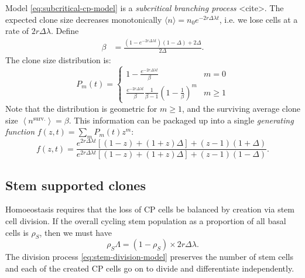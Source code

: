 \documentclass[10pt,UKenglish]{article}
\begin{document}
Model \ref{eq:subcritical-cp-model} is a \emph{subcritical branching process} <cite>. The expected clone size decreases monotonically $\langle n \rangle = n_0 e^{-2 r \Delta \lambda t}$, i.e. we lose cells at a rate of $2 r \Delta \lambda$. Define
\begin{align*}
\beta &= \frac{\left(1-e^{-2 r \Delta \lambda t}\right)(1-\Delta)+2\Delta}{2\Delta}.
\end{align*}
The clone size distribution is:
\begin{equation*}
P_m(t) = \begin{cases}
1 - \frac{e^{-2 r \Delta \lambda t}}{\beta} & m=0 \\
\frac{e^{-2 r \Delta \lambda t}}{\beta} \frac{1}{\beta-1} \left(1-\frac{1}{\beta}\right)^m & m\ge1
\end{cases}
\end{equation*}
Note that the distribution is geometric for $m \ge 1$, and the surviving average clone size $\left\langle n^\textrm{surv.} \right\rangle = \beta$. This information can be packaged up into a single \emph{generating function} $f(z,t) = \sum_m P_m(t) z^m$:
\begin{equation*}
f(z,t) = \frac{e^{2 r \Delta \lambda t}\left[(1-z) + (1+z)\Delta\right] + (z-1)(1+\Delta)}{e^{2 r \Delta \lambda t}\left[(1-z) + (1+z)\Delta\right] + (z-1)(1-\Delta)}.
\end{equation*}

\subsection{\label{sec:subcritical-immigration}Stem supported clones}

Homoeostasis requires that the loss of CP cells be balanced by creation via stem
cell division. If the overall cycling stem population as a proportion of all
basal cells is $\rho_S$, then we must have $$\rho_S \Lambda = (1-\rho_S) \times
2 r \Delta \lambda.$$ The division process \ref{eq:stem-division-model}
preserves the number of stem cells and each of the created CP cells go on to
divide and differentiate independently.
\end{document}
